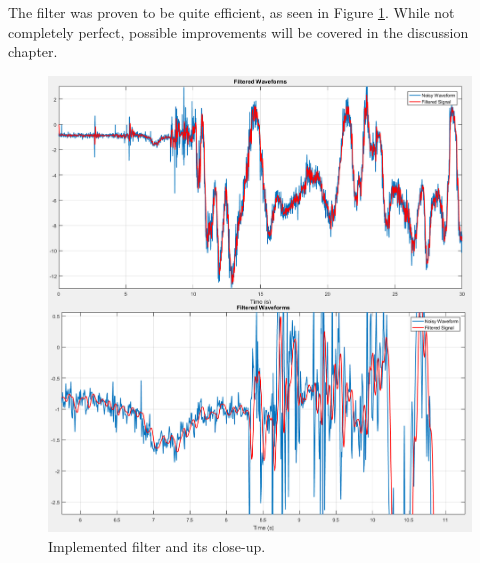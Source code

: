 

The filter was proven to be quite efficient, as seen in Figure \ref{accelFilter}. While not completely perfect, possible improvements will be covered in the discussion chapter.

\begin{figure}[H]
  \centering
    \includegraphics[width=1\textwidth]{images/accelFilter.png}
	\caption{Implemented filter and its close-up.}
	\label{accelFilter}
\end{figure}

